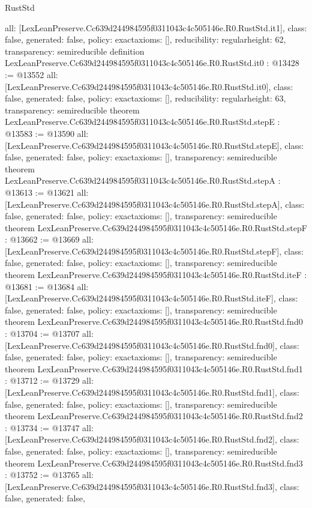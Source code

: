 \begin{lexlean}{RustStd}
\begin{coremodule}
{  all: [LexLeanPreserve.Cc639d244984595f0311043c4c505146e.R0.RustStd.it1],
  class: false,
  generated: false,
  policy: exact{axioms: []},
  reducibility: regular{height: 62},
  transparency: semireducible
}
definition LexLeanPreserve.Cc639d244984595f0311043c4c505146e.R0.RustStd.it0 : @13428 := @13552 {
  all: [LexLeanPreserve.Cc639d244984595f0311043c4c505146e.R0.RustStd.it0],
  class: false,
  generated: false,
  policy: exact{axioms: []},
  reducibility: regular{height: 63},
  transparency: semireducible
}
theorem LexLeanPreserve.Cc639d244984595f0311043c4c505146e.R0.RustStd.stepE : @13583 := @13590 {
  all: [LexLeanPreserve.Cc639d244984595f0311043c4c505146e.R0.RustStd.stepE],
  class: false,
  generated: false,
  policy: exact{axioms: []},
  transparency: semireducible
}
theorem LexLeanPreserve.Cc639d244984595f0311043c4c505146e.R0.RustStd.stepA : @13613 := @13621 {
  all: [LexLeanPreserve.Cc639d244984595f0311043c4c505146e.R0.RustStd.stepA],
  class: false,
  generated: false,
  policy: exact{axioms: []},
  transparency: semireducible
}
theorem LexLeanPreserve.Cc639d244984595f0311043c4c505146e.R0.RustStd.stepF : @13662 := @13669 {
  all: [LexLeanPreserve.Cc639d244984595f0311043c4c505146e.R0.RustStd.stepF],
  class: false,
  generated: false,
  policy: exact{axioms: []},
  transparency: semireducible
}
theorem LexLeanPreserve.Cc639d244984595f0311043c4c505146e.R0.RustStd.iteF : @13681 := @13684 {
  all: [LexLeanPreserve.Cc639d244984595f0311043c4c505146e.R0.RustStd.iteF],
  class: false,
  generated: false,
  policy: exact{axioms: []},
  transparency: semireducible
}
theorem LexLeanPreserve.Cc639d244984595f0311043c4c505146e.R0.RustStd.fnd0 : @13704 := @13707 {
  all: [LexLeanPreserve.Cc639d244984595f0311043c4c505146e.R0.RustStd.fnd0],
  class: false,
  generated: false,
  policy: exact{axioms: []},
  transparency: semireducible
}
theorem LexLeanPreserve.Cc639d244984595f0311043c4c505146e.R0.RustStd.fnd1 : @13712 := @13729 {
  all: [LexLeanPreserve.Cc639d244984595f0311043c4c505146e.R0.RustStd.fnd1],
  class: false,
  generated: false,
  policy: exact{axioms: []},
  transparency: semireducible
}
theorem LexLeanPreserve.Cc639d244984595f0311043c4c505146e.R0.RustStd.fnd2 : @13734 := @13747 {
  all: [LexLeanPreserve.Cc639d244984595f0311043c4c505146e.R0.RustStd.fnd2],
  class: false,
  generated: false,
  policy: exact{axioms: []},
  transparency: semireducible
}
theorem LexLeanPreserve.Cc639d244984595f0311043c4c505146e.R0.RustStd.fnd3 : @13752 := @13765 {
  all: [LexLeanPreserve.Cc639d244984595f0311043c4c505146e.R0.RustStd.fnd3],
  class: false,
  generated: false,
}
\end{coremodule}
\end{lexlean}
